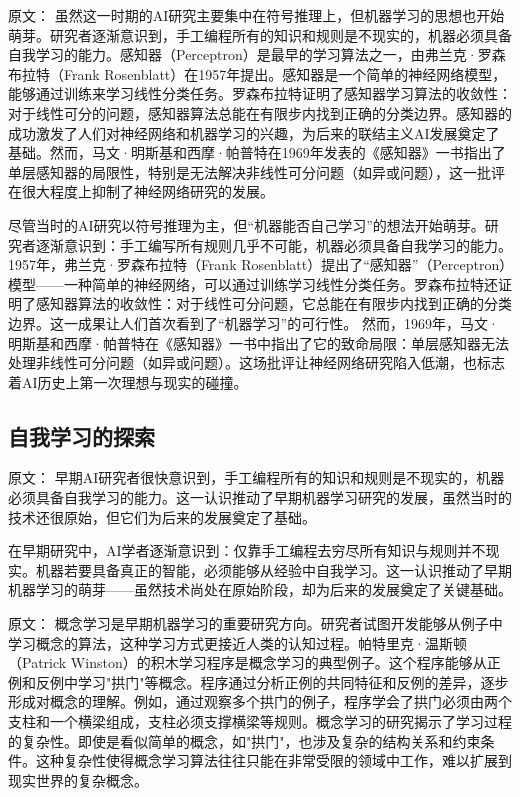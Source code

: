 原文：
虽然这一时期的AI研究主要集中在符号推理上，但机器学习的思想也开始萌芽。研究者逐渐意识到，手工编程所有的知识和规则是不现实的，机器必须具备自我学习的能力。感知器（Perceptron）是最早的学习算法之一，由弗兰克·罗森布拉特（Frank Rosenblatt）在1957年提出。感知器是一个简单的神经网络模型，能够通过训练来学习线性分类任务。罗森布拉特证明了感知器学习算法的收敛性：对于线性可分的问题，感知器算法总能在有限步内找到正确的分类边界。感知器的成功激发了人们对神经网络和机器学习的兴趣，为后来的联结主义AI发展奠定了基础。然而，马文·明斯基和西摩·帕普特在1969年发表的《感知器》一书指出了单层感知器的局限性，特别是无法解决非线性可分问题（如异或问题），这一批评在很大程度上抑制了神经网络研究的发展。\

尽管当时的AI研究以符号推理为主，但“机器能否自己学习”的想法开始萌芽。研究者逐渐意识到：手工编写所有规则几乎不可能，机器必须具备自我学习的能力。  
1957年，弗兰克·罗森布拉特（Frank Rosenblatt）提出了“感知器”（Perceptron）模型——一种简单的神经网络，可以通过训练学习线性分类任务。罗森布拉特还证明了感知器算法的收敛性：对于线性可分问题，它总能在有限步内找到正确的分类边界。这一成果让人们首次看到了“机器学习”的可行性。  
然而，1969年，马文·明斯基和西摩·帕普特在《感知器》一书中指出了它的致命局限：单层感知器无法处理非线性可分问题（如异或问题）。这场批评让神经网络研究陷入低潮，也标志着AI历史上第一次理想与现实的碰撞。

\subsection{自我学习的探索}

原文：
早期AI研究者很快意识到，手工编程所有的知识和规则是不现实的，机器必须具备自我学习的能力。这一认识推动了早期机器学习研究的发展，虽然当时的技术还很原始，但它们为后来的发展奠定了基础。

在早期研究中，AI学者逐渐意识到：仅靠手工编程去穷尽所有知识与规则并不现实。机器若要具备真正的智能，必须能够从经验中自我学习。这一认识推动了早期机器学习的萌芽——虽然技术尚处在原始阶段，却为后来的发展奠定了关键基础。

原文：
概念学习是早期机器学习的重要研究方向。研究者试图开发能够从例子中学习概念的算法，这种学习方式更接近人类的认知过程。帕特里克·温斯顿（Patrick Winston）的积木学习程序是概念学习的典型例子。这个程序能够从正例和反例中学习"拱门"等概念。程序通过分析正例的共同特征和反例的差异，逐步形成对概念的理解。例如，通过观察多个拱门的例子，程序学会了拱门必须由两个支柱和一个横梁组成，支柱必须支撑横梁等规则。概念学习的研究揭示了学习过程的复杂性。即使是看似简单的概念，如"拱门"，也涉及复杂的结构关系和约束条件。这种复杂性使得概念学习算法往往只能在非常受限的领域中工作，难以扩展到现实世界的复杂概念。

